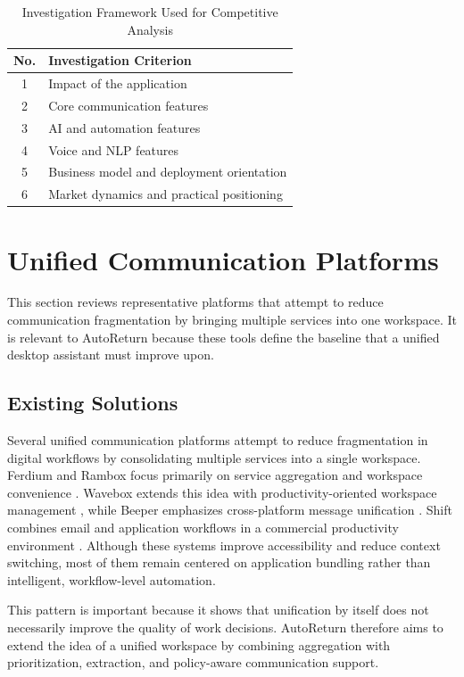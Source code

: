 \begin{table}[!htbp]
\centering
\small
\renewcommand{\arraystretch}{1.1}
\begin{tabular}{|c|>{\raggedright\arraybackslash}p{11cm}|}
\hline
\textbf{No.} & \textbf{Investigation Criterion} \\ \hline
1 & Impact of the application \\ \hline
2 & Core communication features \\ \hline
3 & AI and automation features \\ \hline
4 & Voice and NLP features \\ \hline
5 & Business model and deployment orientation \\ \hline
6 & Market dynamics and practical positioning \\ \hline
\end{tabular}
\caption{Investigation Framework Used for Competitive Analysis}
\label{tab:investigation_framework}
\end{table}
\FloatBarrier

\section{Unified Communication Platforms}
\noindent This section reviews representative platforms that attempt to reduce communication fragmentation by bringing multiple services into one workspace. It is relevant to AutoReturn because these tools define the baseline that a unified desktop assistant must improve upon.

\subsection{Existing Solutions}
Several unified communication platforms attempt to reduce fragmentation in digital workflows by consolidating multiple services into a single workspace. Ferdium and Rambox focus primarily on service aggregation and workspace convenience \cite{ferdium2024}. Wavebox extends this idea with productivity-oriented workspace management \cite{wavebox2024}, while Beeper emphasizes cross-platform message unification \cite{beeper2024}. Shift combines email and application workflows in a commercial productivity environment \cite{shift2024}. Although these systems improve accessibility and reduce context switching, most of them remain centered on application bundling rather than intelligent, workflow-level automation.

This pattern is important because it shows that unification by itself does not necessarily improve the quality of work decisions. AutoReturn therefore aims to extend the idea of a unified workspace by combining aggregation with prioritization, extraction, and policy-aware communication support.

